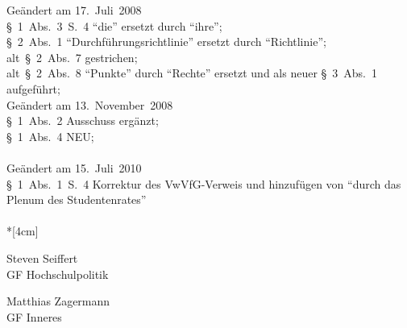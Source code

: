 \footnotesize
Geändert am 17.~Juli~2008\\
§~1~Abs.~3~S.~4 "`die"' ersetzt durch "`ihre"';\\
§~2~Abs.~1 "`Durchführungsrichtlinie"' ersetzt durch "`Richtlinie"';\\
alt~§~2~Abs.~7 gestrichen;\\
alt~§~2~Abs.~8 "`Punkte"' durch "`Rechte"' ersetzt und als neuer §~3~Abs.~1 aufgeführt;\\
Geändert am 13.~November~2008\\
§~1~Abs.~2 Ausschuss ergänzt;\\
§~1~Abs.~4 NEU;\\
\\
Geändert am 15.~Juli~2010\\
§~1~Abs.~1~S.~4 Korrektur des VwVfG-Verweis und hinzufügen von "`durch das Plenum des Studentenrates"' \\

\normalsize
~\\*[4cm]
\begin{center}
\hspace*{\fill}
\parbox{7cm}{Steven Seiffert\\GF Hochschulpolitik}
\hfill\parbox{7cm}{Matthias Zagermann\\GF Inneres}\hspace*{\fill}
\end{center}